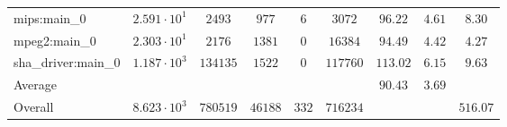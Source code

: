 \begin{tabular}{|l|c|c|c|c|c|c|c|c|}
mips:main\_0            & $ 2.591 \cdot 10^{1} $ & $ 2493   $ & $ 977   $ & $ 6   $ & $ 3072   $ & $ 96.22       $ & $ 4.61    $ & $ 8.30    $ \\
mpeg2:main\_0           & $ 2.303 \cdot 10^{1} $ & $ 2176   $ & $ 1381  $ & $ 0   $ & $ 16384  $ & $ 94.49       $ & $ 4.42    $ & $ 4.27    $ \\
sha\_driver:main\_0     & $ 1.187 \cdot 10^{3} $ & $ 134135 $ & $ 1522  $ & $ 0   $ & $ 117760 $ & $ 113.02      $ & $ 6.15    $ & $ 9.63    $ \\
\hline
Average                 & $                    $ & $        $ & $       $ & $     $ & $        $ & $ 90.43       $ & $ 3.69    $ & $         $ \\
\hline
Overall                 & $ 8.623 \cdot 10^{3} $ & $ 780519 $ & $ 46188 $ & $ 332 $ & $ 716234 $ & $             $ & $         $ & $ 516.07  $ \\
\hline
\end{tabular}
